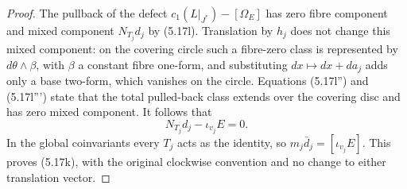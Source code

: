 \begin{proof}
The pullback of the defect
\(c_1(L|_{J^*})-[\Omega_E]\) has zero fibre component and mixed
component \(N_{T_j}d_j\) by (5.17l).  Translation by \(h_j\) does
not change this mixed component: on the covering circle such
a fibre-zero class is represented by
\(d\theta\wedge\beta\), with \(\beta\) a constant fibre one-form,
and substituting \(dx\mapsto dx+d a_j\) adds only a base two-form,
which vanishes on the circle.  Equations (5.17l'') and
(5.17l''') state that the total pulled-back class extends over
the covering disc and has zero mixed component.  It follows that
\[
 N_{T_j}d_j-\iota_{v_j}E=0.
\]
In the global coinvariants every \(T_j\) acts as the identity,
so \(m_j\bar d_j=[\iota_{v_j}E]\).  This proves (5.17k), with the
original clockwise convention and no change to either translation
vector.
\end{proof}

